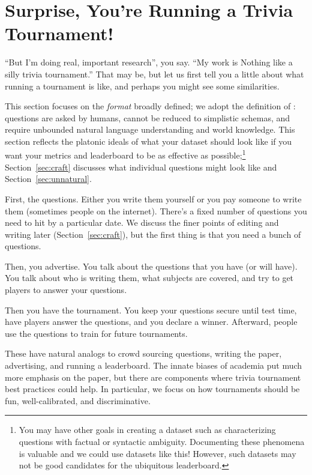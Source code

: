

\section{Surprise, You're Running a Trivia Tournament!}
\label{sec:tournament}


``But I'm doing real, important research'', you say.  
``My work is Nothing like a silly trivia tournament.''  
That may be, but let us first tell you a little about what running a tournament is like, and perhaps you might see some similarities.

This section focuses on the  \emph{format} broadly defined; we adopt the definition of :
questions are asked by humans,
cannot be reduced to simplistic schemas,
and require unbounded natural language understanding and world knowledge. 
This section reflects the platonic ideals of what your dataset should look like if you want your metrics and leaderboard to be as effective as possible;\footnote{You may have other goals in creating a  dataset such as characterizing questions with factual or syntactic ambiguity.  Documenting these phenomena is valuable and we could use datasets like this!  However, such datasets may not be good candidates for the ubiquitous leaderboard.} Section~\ref{sec:craft} discusses what individual questions might look like and Section~\ref{sec:unnatural}.

First, the questions.
Either you write them yourself or you pay someone to write them (sometimes people on the internet). 
There's a fixed number of questions you need to hit by a particular date. 
We discuss the finer points of editing and writing later (Section~\ref{sec:craft}), but the first thing is that you need a bunch of questions.

Then, you advertise.  
You talk about the questions that you have (or will have).  
You talk about who is writing them, what subjects are covered, and try to get players to answer your questions.

Then you have the tournament. 
You keep your questions secure until test time, have players answer the questions, and you declare a winner. 
Afterward, people use the questions to train for future tournaments.

These have natural analogs to crowd sourcing questions, writing the paper, advertising, and running a leaderboard. 
The innate biases of academia put much more emphasis on the paper, but there are components where trivia tournament best practices could help. 
In particular, we focus on how tournaments should be fun, well-calibrated, and discriminative.

